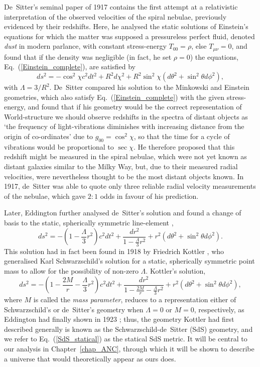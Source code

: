 De~Sitter's seminal paper of 1917 \cite{deSitter1917} contains the first attempt at a relativistic interpretation of the observed velocities of the spiral nebulae, previously evidenced by their redshifts. Here, he analysed the static solutions of Einstein's equations for which the matter was supposed a pressureless perfect fluid, denoted \textit{dust} in modern parlance, with constant stress-energy $T_{00}=\rho$, else $T_{\mu\nu}=0$, and found that if the density was negligible (in fact, he set $\rho=0$) the equations, Eq.~(\ref{Einstein_complete}), are satisfied by
\begin{equation}
ds^2=-\cos^2\chi{c^2}dt^2+R^2d\chi^2+R^2\sin^2\chi(d\theta^2+\sin^2\theta{d\phi^2}),\label{deSitter}
\end{equation} 
with $\Lambda=3/R^2$. De~Sitter compared his solution to the Minkowski and Einstein geometries, which also satisfy Eq.~(\ref{Einstein_complete}) with the given stress-energy, and found that if his geometry would be the correct representation of World-structure we should observe redshifts in the spectra of distant objects as `the frequency of light-vibrations diminishes with increasing distance from the origin of co-ordinates' due to $g_{00}=\cos^2\chi$, so that the time for a cycle of vibrations would be proportional to $\sec\chi$. He therefore proposed that this redshift might be measured in the spiral nebulae, which were not yet known as distant galaxies similar to the Milky Way, but, due to their measured radial velocities, were nevertheless thought to be the most distant objects known. In 1917, de~Sitter was able to quote only three reliable radial velocity measurements of the nebulae, which gave $2:1$ odds in favour of his prediction.

Later, Eddington further analysed de~Sitter's solution and found a change of basis to the static, spherically symmetric line-element \cite{Eddington1923},
\begin{equation}
ds^2=-\left(1-\frac{\Lambda}{3}r^2\right)c^2dt^2+\frac{dr^2}{1-\frac{\Lambda}{3}r^2}+r^2(d\theta^2+\sin^2\theta{d\phi^2}).\label{deSitter_statical}
\end{equation}
This solution had in fact been found in 1918 by Friedrich Kottler \cite{Kottler1918}, who generalised Karl Schwarzschild's solution for a static, spherically symmetric point mass \cite{Schwarzschild1916,Schwarzschild2003} to allow for the possibility of non-zero $\Lambda$. Kottler's solution,
\begin{equation}
ds^2=-\left(1-\frac{2M}{r}-\frac{\Lambda}{3}r^2\right)c^2dt^2+\frac{dr^2}{1-\frac{2M}{r}-\frac{\Lambda}{3}r^2}+r^2(d\theta^2+\sin^2\theta{d\phi^2}),\label{SdS_statical}
\end{equation}
where $M$ is called the \textit{mass parameter}, reduces to a representation either of Schwarzschild's or de~Sitter's geometry when $\Lambda=0$ or $M=0$, respectively, as Eddington had finally shown in 1923 \cite{Eddington1923}; thus, the geometry Kottler had first described generally is known as the Schwarzschild-de~Sitter (SdS) geometry, and we refer to Eq.~(\ref{SdS_statical}) as the statical SdS metric. It will be central to our analysis in Chapter~\ref{chap_ANC}, through which it will be shown to describe a universe that would theoretically appear as ours does.

